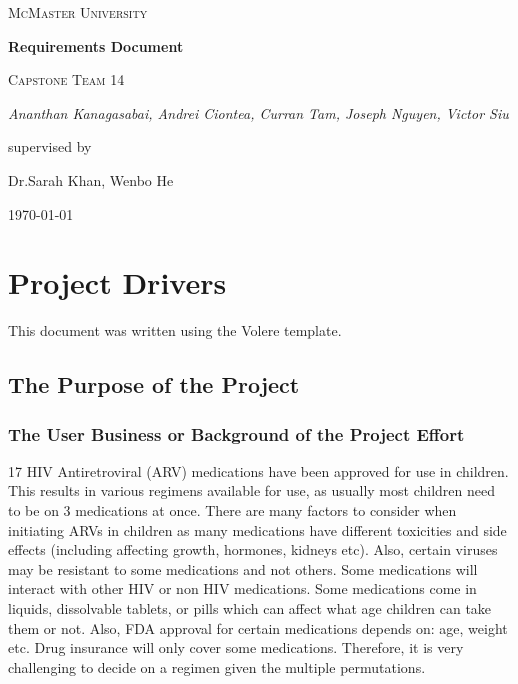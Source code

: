 \documentclass[12pt]{article}
\begin{document}
\begin{titlepage}
	\centering
	{\scshape\LARGE McMaster University \par}
	\vspace{1.5cm}
	{\huge\bfseries Requirements Document \par}

	\vspace{1cm}
	{\scshape\Large Capstone Team 14\par}
	{\Large\itshape Ananthan Kanagasabai, Andrei Ciontea, Curran Tam, Joseph Nguyen, Victor Siu \par}
	\vspace{3cm}
	\vfill
	supervised by\par
	Dr.Sarah Khan, Wenbo He

	\vfill
	{\large \today\par}
\end{titlepage}

\newpage

\tableofcontents
\listoffigures
\listoftables
\newpage


\section{Project Drivers}
This document was written using the Volere template.

\subsection{The Purpose of the Project }
\subsubsection{The User Business or Background of the Project Effort}
17 HIV Antiretroviral (ARV) medications have been approved for use in children. This results in various regimens available for use, as usually most children need to be on 3 medications at once. There are many factors to consider when initiating ARVs in children as many medications have different toxicities and side effects (including affecting growth, hormones, kidneys etc). Also, certain viruses may be resistant to some medications and not others. Some medications will interact with other HIV or non HIV medications. Some medications come in liquids, dissolvable tablets, or pills which can affect what age children can take them or not. Also, FDA approval for certain medications depends on: age, weight etc. Drug insurance will only cover some medications. Therefore, it is very challenging to decide on a regimen given the multiple permutations.
\end{document}
